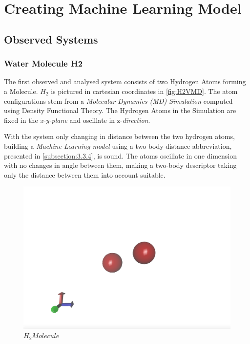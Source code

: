 \chapter{Creating Machine Learning Model}
\label{chapter:4}

\section{Observed Systems}
\label{section:4.1}

\subsection{Water Molecule H2}
\label{subsection:4.1.1}

The first observed and analysed system consists of  two Hydrogen Atoms forming a Molecule. $H_2$ is pictured in cartesian coordinates in \ref{fig:H2VMD}. The atom configurations stem from a \textit{Molecular Dynamics (MD) Simulation} computed using Density Functional Theory. The Hydrogen Atoms in the Simulation are fixed in the \textit{x-y-plane} and oscillate in z-\textit{direction}. 

With the system only changing in distance between the two hydrogen atoms, building a \textit{Machine Learning model} using a  two body distance abbreviation, presented  in \ref{subsection:3.3.4}, is sound. The atoms oscillate in one dimension with no changes in angle between them, making a two-body descriptor taking only the distance between them into account suitable. 

\begin{figure}
	\includegraphics{../Bilder/Hydrogen_Tuple_Fig1.png}
	\caption{$H_2 Molecule$}
	\label{H2VMD}
\end{figure}


